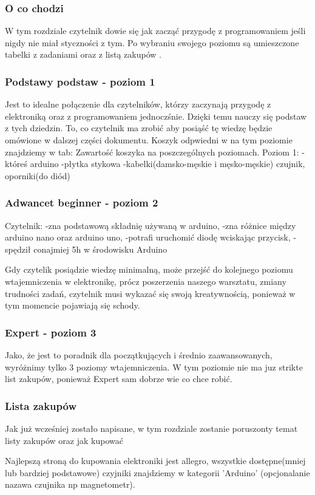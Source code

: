 \subsubsection{ O co chodzi}
W tym rozdziale czytelnik dowie się jak zacząć przygodę z programowaniem jeśli nigdy nie miał styczności z tym. Po wybraniu swojego poziomu są umieszczone tabelki z zadaniami oraz z listą zakupów .
\subsubsection{Podstawy podstaw - poziom 1}
Jest to idealne połączenie dla czytelników, którzy zaczynają przygodę z elektroniką oraz z programowaniem jednoczśnie. Dzięki temu nauczy się podstaw z tych dziedzin. 
To, co czytelnik ma zrobić aby posiąść tę wiedzę będzie omówione w dalszej części dokumentu. Koszyk odpwiedni w na tym poziomie znajdziemy w tab: Zawartość koszyka na poszczególnych poziomach.
Poziom 1:
-któreś arduino
-płytka stykowa
-kabelki(damsko-męskie i męsko-męskie)
czujnik, oporniki(do diód)
\subsubsection{Adwancet beginner - poziom 2}
Czytelnik:
-zna podstawową składnię używaną w arduino,
-zna różnice między arduino nano oraz arduino uno,
-potrafi uruchomić diodę wciskając przycisk,
-spędził conajmiej 5h w środowisku Arduino

Gdy czytelik posiądzie wiedzę minimalną, może przejść do kolejnego poziomu wtajemniczenia w elektronikę, prócz poszerzenia naszego warsztatu, zmiany trudności zadań, czytelnik musi wykazać się swoją kreatywnością, ponieważ w tym momencie pojawiają się schody.

\subsubsection{Expert - poziom 3}
Jako, że jest to poradnik dla początkujących i średnio zaawansowanych, wyróżnimy tylko 3 poziomy wtajemniczenia. W tym poziomie nie ma juz strikte list zakupów, ponieważ Expert sam dobrze wie co chce robić. 
\subsubsection{Lista zakupów}
Jak już wcześniej zostało napisane, w tym rozdziale zostanie poruszonty temat listy zakupów oraz jak kupować

 Najlepszą stroną do kupowania elektroniki jest allegro, wszystkie dostępne(mniej lub bardziej podstawowe) czyjniki znajdziemy w kategorii 'Arduino' (opcjonalanie nazawa czujnika np magnetometr).

